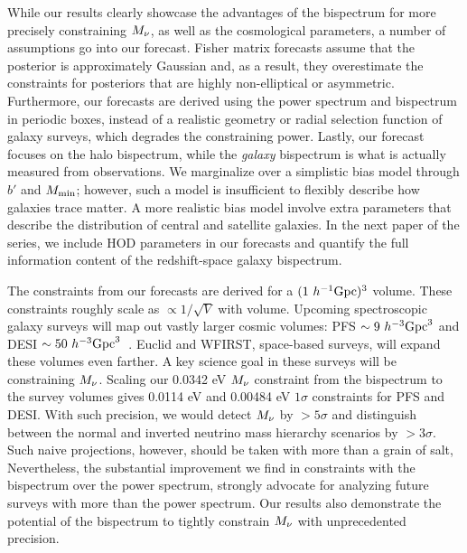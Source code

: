 While our results clearly showcase the advantages of the bispectrum for
more precisely constraining $M_\nu$, as well as the cosmological parameters, 
a number of assumptions go into our forecast. Fisher matrix forecasts assume 
that the posterior is approximately Gaussian and, as a result, they 
overestimate the constraints for posteriors that are highly non-elliptical 
or asymmetric. Furthermore, our forecasts are derived using the power spectrum 
and bispectrum in periodic boxes, instead of a realistic geometry or 
radial selection function of galaxy surveys, which degrades the constraining power. 
Lastly, our forecast
focuses on the halo bispectrum, while the \emph{galaxy} bispectrum is what is 
actually measured from observations. We marginalize over a simplistic bias model 
through $b'$ and $M_{\rm min}$; however, such a model is insufficient to 
flexibly describe how galaxies trace matter. A more realistic bias model 
involve extra parameters that describe the distribution of central and satellite 
galaxies. In the next paper of the series, we include HOD parameters in our
forecasts and quantify the full information content of the redshift-space 
galaxy bispectrum. 

The constraints from our forecasts are derived for a $(1~h^{-1}{\rm Gpc})^3$ 
volume. These constraints roughly scale as $\propto1/\sqrt{V}$ with volume. 
Upcoming spectroscopic galaxy surveys will map out vastly larger cosmic
volumes: PFS $\sim 9~h^{-3}{\rm Gpc}^3$ and DESI $\sim 50~h^{-3}{\rm Gpc}^3$~\citep{takada2014, desicollaboration2016}. 
Euclid and WFIRST, space-based surveys, will expand these volumes even 
farther. A key science goal in these surveys will be constraining $M_\nu$. 
Scaling our 0.0342 eV $M_\nu$ constraint from the bispectrum to the survey 
volumes gives 0.0114 eV and 0.00484 eV $1\sigma$ constraints for PFS 
and DESI. With such precision, we would detect $M_\nu$ by $>5\sigma$ and 
distinguish between the normal and inverted neutrino mass hierarchy scenarios 
by $>3\sigma$. Such naive projections, however, should be taken with more than 
a grain of salt, Nevertheless, the substantial improvement we find in 
constraints with the bispectrum over the power spectrum, strongly advocate for 
analyzing future surveys with more than the power spectrum. Our results also 
demonstrate the potential of the bispectrum to tightly constrain $M_\nu$ with 
unprecedented precision.
